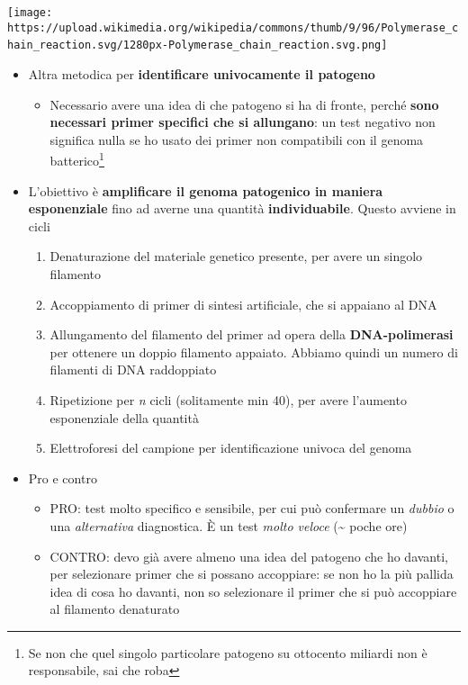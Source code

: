 \documentclass[italian,]{article}
\providecommand{\tightlist}{%
  \setlength{\itemsep}{0pt}\setlength{\parskip}{0pt}}
\begin{document}
\texttt{[image: https://upload.wikimedia.org/wikipedia/commons/thumb/9/96/Polymerase\_chain\_reaction.svg/1280px-Polymerase\_chain\_reaction.svg.png]}~

\begin{itemize}
\tightlist
\item
  Altra metodica per \textbf{identificare univocamente il patogeno}

  \begin{itemize}
  \tightlist
  \item
    Necessario avere una idea di che patogeno si ha di fronte, perché
    \textbf{sono necessari primer specifici che si allungano}: un test
    negativo non significa nulla se ho usato dei primer non compatibili
    con il genoma batterico\footnote{Se non che quel singolo particolare
      patogeno su ottocento miliardi non è responsabile, sai che roba}
  \end{itemize}
\item
  L'obiettivo è \textbf{amplificare il genoma patogenico in maniera
  esponenziale} fino ad averne una quantità \textbf{individuabile}.
  Questo avviene in cicli

  \begin{enumerate}
  \def\labelenumi{\arabic{enumi}.}
  \tightlist
  \item
    Denaturazione del materiale genetico presente, per avere un singolo
    filamento
  \item
    Accoppiamento di primer di sintesi artificiale, che si appaiano al
    DNA
  \item
    Allungamento del filamento del primer ad opera della
    \textbf{DNA-polimerasi} per ottenere un doppio filamento appaiato.
    Abbiamo quindi un numero di filamenti di DNA raddoppiato
  \item
    Ripetizione per \emph{n} cicli (solitamente min 40), per avere
    l'aumento esponenziale della quantità
  \item
    Elettroforesi del campione per identificazione univoca del genoma
  \end{enumerate}
\item
  Pro e contro

  \begin{itemize}
  \tightlist
  \item
    PRO: test molto specifico e sensibile, per cui può confermare un
    \emph{dubbio} o una \emph{alternativa} diagnostica. È un test
    \emph{molto veloce} (\textasciitilde{} poche ore)
  \item
    CONTRO: devo già avere almeno una idea del patogeno che ho davanti,
    per selezionare primer che si possano accoppiare: se non ho la più
    pallida idea di cosa ho davanti, non so selezionare il primer che si
    può accoppiare al filamento denaturato
  \end{itemize}
\end{itemize}
\end{document}
